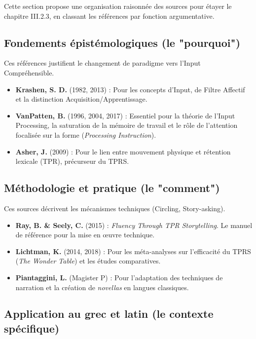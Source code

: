 Cette section propose une organisation raisonnée des sources pour étayer le chapitre III.2.3, en
classant les références par fonction argumentative.



\subsection{Fondements épistémologiques (le "pourquoi")}

Ces références justifient le changement de paradigme vers l'Input Compréhensible.

\begin{itemize}\item \textbf{Krashen, S. D.} (1982, 2013) : Pour les concepts d'Input, de Filtre Affectif et la distinction Acquisition/Apprentissage.\cite{III-2-3-ref2}\item \textbf{VanPatten, B.} (1996, 2004, 2017) : Essentiel pour la théorie de l'Input Processing, la saturation de la mémoire de travail et le rôle de l'attention focalisée sur la forme (\textit{Processing Instruction}).\cite{III-2-3-ref4}\item \textbf{Asher, J.} (2009) : Pour le lien entre mouvement physique et rétention lexicale (TPR), précurseur du TPRS.\cite{III-2-3-ref2}\end{itemize}

\subsection{Méthodologie et pratique (le "comment")}

Ces sources décrivent les mécanismes techniques (Circling, Story-asking).

\begin{itemize}\item \textbf{Ray, B. \& Seely, C.} (2015) : \textit{Fluency Through TPR Storytelling}. Le manuel de référence pour la mise en œuvre technique.\cite{III-2-3-ref1}\item \textbf{Lichtman, K.} (2014, 2018) : Pour les méta-analyses sur l'efficacité du TPRS (\textit{The Wonder Table}) et les études comparatives.\cite{III-2-3-ref31}\item \textbf{Piantaggini, L.} (Magister P) : Pour l'adaptation des techniques de narration et la création de \textit{novellas} en langues classiques.\cite{III-2-3-ref20}\end{itemize}

\subsection{Application au grec et latin (le contexte spécifique)}

